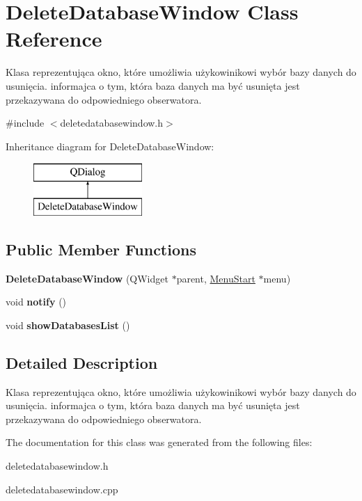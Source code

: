 \hypertarget{class_delete_database_window}{}\section{Delete\+Database\+Window Class Reference}
\label{class_delete_database_window}


Klasa reprezentująca okno, które umożliwia użykowinikowi wybór bazy danych do usunięcia. informajca o tym, która baza danych ma być usunięta jest przekazywana do odpowiedniego obserwatora.  




{\ttfamily \#include $<$deletedatabasewindow.\+h$>$}

Inheritance diagram for Delete\+Database\+Window\+:\begin{figure}[H]
\begin{center}
\leavevmode
\includegraphics[height=2.000000cm]{class_delete_database_window}
\end{center}
\end{figure}
\subsection*{Public Member Functions}
\begin{DoxyCompactItemize}
\item 
\mbox{\label{class_delete_database_window_ad7444fa62ecdc1353ba6a732b2032c9f}} 
{\bfseries Delete\+Database\+Window} (Q\+Widget $\ast$parent, \mbox{\hyperlink{class_menu_start}{Menu\+Start}} $\ast$menu)
\item 
\mbox{\label{class_delete_database_window_a79ea3f315e503959e6ed994c51fb2766}} 
void {\bfseries notify} ()
\item 
\mbox{\label{class_delete_database_window_a0e0acab9961e2466c1238fb03d050816}} 
void {\bfseries show\+Databases\+List} ()
\end{DoxyCompactItemize}


\subsection{Detailed Description}
Klasa reprezentująca okno, które umożliwia użykowinikowi wybór bazy danych do usunięcia. informajca o tym, która baza danych ma być usunięta jest przekazywana do odpowiedniego obserwatora. 

The documentation for this class was generated from the following files\+:\begin{DoxyCompactItemize}
\item 
deletedatabasewindow.\+h\item 
deletedatabasewindow.\+cpp\end{DoxyCompactItemize}
